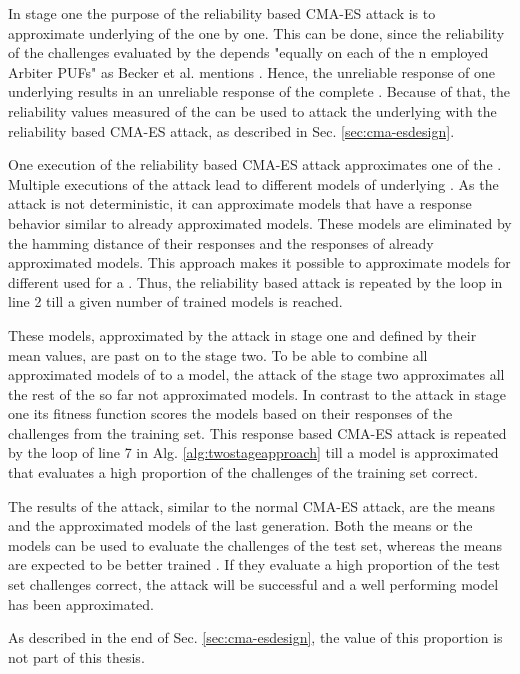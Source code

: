 In stage one the purpose of the reliability based \ac{CMA-ES} attack is to approximate underlying \apufs of the \xpuf one by one.
This can be done, since the reliability of the challenges evaluated by the \xpuf depends "equally on each of the n employed Arbiter PUFs" as Becker et al. mentions \cite{Becker2015ThePUFs}. %
Hence, the unreliable response of one underlying \apuf results in an unreliable response of the complete \puf.
Because of that, the reliability values measured of the \xpuf can be used to attack the underlying \apufs with the reliability based \ac{CMA-ES} attack, as described in Sec. \ref{sec:cma-esdesign}.

One execution of the reliability based \ac{CMA-ES} attack approximates one of the \apufs.
Multiple executions of the attack lead to different models of underlying \apufs. %
As the attack is not deterministic, it can approximate models that have a response behavior similar to already approximated models.
These models are eliminated by the hamming distance of their responses and the responses of already approximated models. %
This approach makes it possible to approximate models for different \apufs used for a \xpuf.
Thus, the reliability based attack is repeated by the loop in line 2 till a given number of trained models is reached.

These models, approximated by the attack in stage one and defined by their mean values, are past on to the stage two.
To be able to combine all approximated models of \apuf to a \xpuf model, the attack of the stage two approximates all the rest of the so far not approximated models. %
In contrast to the attack in stage one its fitness function scores the models based on their responses of the challenges from the training set. %
This response based \ac{CMA-ES} attack is repeated by the loop of line 7 in Alg. \ref{alg:twostageapproach} till a model is approximated that evaluates a high proportion of the challenges of the training set correct.

The results of the attack, similar to the normal \ac{CMA-ES} attack, are the means and the approximated models of the last generation.
Both the means or the models can be used to evaluate the challenges of the test set, whereas the means are expected to be better trained \cite{Wikipedia2017CMA-ES}.
If they evaluate a high proportion of the test set challenges correct, the attack will be successful and a well performing model has been approximated. %

As described in the end of Sec. \ref{sec:cma-esdesign}, the value of this proportion is not part of this thesis.

